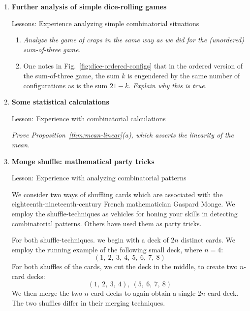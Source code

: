 \begin{enumerate}

\medskip\item
{\bf Further analysis of simple dice-rolling games}

{\sc Lessons:} Experience analyzing simple combinatorial situations

\smallskip

  \begin{enumerate}
  \item
{\em Analyze the game of craps in the same way as we did for the (unordered) sum-of-three game.}

  \medskip\item
One notes in Fig.~\ref{fig:dice-ordered-configs} that in the ordered version of the sum-of-three game, the sum $k$ is engendered by the same number of configurations as is the sum $21 - k$.  
{\em Explain why this is true.}
  \end{enumerate}
  

\smallskip
\medskip\item
{\bf Some statistical calculations}

{\sc Lesson:} Experience with combinatorial calculations

\smallskip
  
{\em Prove Proposition~\ref{thm:mean-linear}(a), which asserts the linearity of the mean.}


\medskip\item
{\bf Monge shuffle: mathematical party tricks}

{\sc Lesson:} Experience with analyzing combinatorial patterns

\smallskip

 

We consider two ways of shuffling cards which are associated with the eighteenth-nineteenth-century French mathematician Gaspard Monge.  We employ the shuffle-techniques as vehicles for honing your skills in detecting combinatorial patterns.  Others have used them as party tricks.

\smallskip

For both shuffle-techniques. we begin with a deck of $2n$ distinct cards.  We employ the running example of the following small deck, where $n=4$:
\[ (1, \ 2, \ 3, \ 4, \ 5, \ 6, \ 7, \ 8) \]
For both shuffles of the cards, we cut the deck in the middle, to create two $n$-card decks:
\[ (1, \ 2, \ 3, \ 4), \ (5, \ 6, \ 7, \ 8) \]
We then merge the two $n$-card decks to again obtain a single $2n$-card deck.  
The two shuffles differ in their merging techniques.


\end{enumerate}
